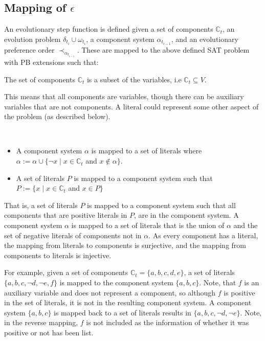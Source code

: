 \subsection{Mapping of $\epsilon$}
An evolutionary step function is defined given a set of components $\mathbb{C}_t$, an evolution problem $\delta_{t_i} \cup \omega_{t_i}$,
a component system $\alpha_{t_{i-1}}$, and an evolutionary preference order $\prec_{\alpha_{t_{i-1}}}$.
These are mapped to the above defined SAT problem with PB extensions such that:
\begin{defs}
The set of components $\mathbb{C}_t$ is a subset of the variables, i.e $\mathbb{C}_t \subseteq V$.
\end{defs}
This means that all components are variables, though there can be auxiliary variables that are not components.
A literal could represent some other aspect of the problem (as described below).

\begin{defs}
{\ }
\begin{itemize}
  \item A component system $\alpha$ is mapped to a set of literals where $\alpha := \alpha \cup \{\neg x \mid x \in \mathbb{C}_t$ and $ x \not \in \alpha\}$.
  \item A set of literals $P$ is mapped to a component system such that $P := \{x \mid x \in \mathbb{C}_t$ and $x \in P\}$
\end{itemize}
\end{defs}
That is, a set of literals $P$ is mapped to a component system such that all components that are positive literals in $P$, are in the component system.
A component system $\alpha$ is mapped to a set of literals that is the union of $\alpha$ and the set of negative literals of components not in $\alpha$.
As every component has a literal, the mapping from literals to components is surjective, and the mapping from components to literals is injective.

For example, given a set of components $\mathbb{C}_t = \{a,b,c,d,e\}$, a set of literals $\{a,b,c,\neg d,\neg e,f\}$ is mapped to the component system $\{a,b,c\}$.
Note, that $f$ is an auxiliary variable and does not represent a component, so although $f$ is positive in the set of literals, it is not in the resulting component system.
A component system $\{a,b,c\}$ is mapped back to a set of literals results in $\{a,b,c,\neg d,\neg e\}$.
Note, in the reverse mapping, $f$ is not included as the information of whether it was positive or not has been list.

